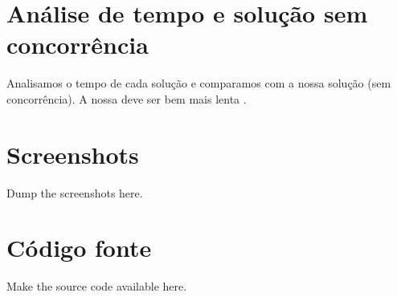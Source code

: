 \documentclass[conference]{IEEEtran}
\begin{document}
\section{Análise de tempo e solução sem concorrência}

Analisamos o tempo de cada solução e comparamos com a nossa solução (sem concorrência). A nossa deve ser bem mais lenta .

\section{Screenshots}

Dump the screenshots here.

\section{Código fonte}

Make the source code available here.


\end{document}
